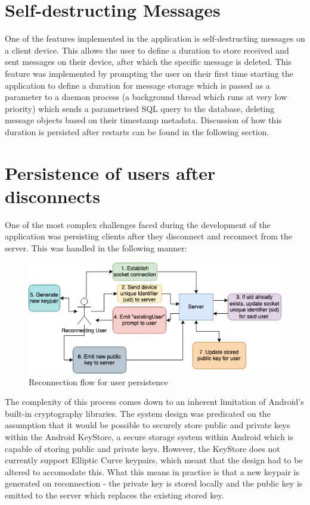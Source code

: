 \documentclass{mproj}
\begin{document}
\section{Self-destructing Messages}
One of the features implemented in the application is self-destructing messages on a client device. This allows the user to define a duration to store received and sent messages on their device, after which the specific message is deleted. This feature was implemented by prompting the user on their first time starting the application to define a duration for message storage which is passed as a parameter to a daemon process (a background thread which runs at very low priority) which sends a parametrised SQL query to the database, deleting message objects based on their timestamp metadata. Discussion of how this duration is persisted after restarts can be found in the following section.

\section{Persistence of users after disconnects}
One of the most complex challenges faced during the development of the application was persisting clients after they disconnect and reconnect from the server. This was handled in the following manner:
\begin{figure}[H]
	\includegraphics[scale=0.6]{images/reconnection-flow.png}
	\caption{Reconnection flow for user persistence}
\end{figure}
The complexity of this process comes down to an inherent limitation of Android's built-in cryptography libraries. The system design was predicated on the assumption that it would be possible to securely store public and private keys within the Android KeyStore\cite{cooijmans2014analysis}, a secure storage system within Android which is capable of storing public and private keys. However, the KeyStore does not currently support Elliptic Curve keypairs, which meant that the design had to be altered to accomodate this. What this means in practice is that a new keypair is generated on reconnection - the private key is stored locally and the public key is emitted to the server which replaces the existing stored key. 
\end{document}
